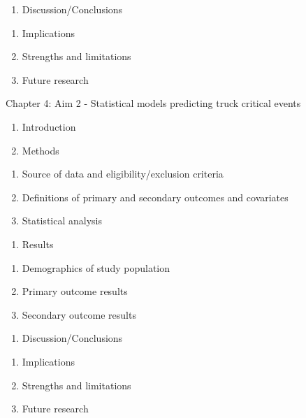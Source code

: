 \documentclass[12pt]{book}
\numberwithin{equation}{chapter}
\providecommand{\tightlist}{%
  \setlength{\itemsep}{0pt}\setlength{\parskip}{0pt}}
\begin{document}
\begin{enumerate}
\def\labelenumi{\Alph{enumi}.}
\setcounter{enumi}{3}
\tightlist
\item
  Discussion/Conclusions
\end{enumerate}

\begin{enumerate}
\def\labelenumi{\arabic{enumi}.}
\tightlist
\item
  Implications
\item
  Strengths and limitations
\item
  Future research
\end{enumerate}

Chapter 4: Aim 2 - Statistical models predicting truck critical events

\begin{enumerate}
\def\labelenumi{\Alph{enumi}.}
\tightlist
\item
  Introduction
\item
  Methods
\end{enumerate}

\begin{enumerate}
\def\labelenumi{\arabic{enumi}.}
\tightlist
\item
  Source of data and eligibility/exclusion criteria
\item
  Definitions of primary and secondary outcomes and covariates
\item
  Statistical analysis
\end{enumerate}

\begin{enumerate}
\def\labelenumi{\Alph{enumi}.}
\setcounter{enumi}{2}
\tightlist
\item
  Results
\end{enumerate}

\begin{enumerate}
\def\labelenumi{\arabic{enumi}.}
\tightlist
\item
  Demographics of study population
\item
  Primary outcome results
\item
  Secondary outcome results
\end{enumerate}

\begin{enumerate}
\def\labelenumi{\Alph{enumi}.}
\setcounter{enumi}{3}
\tightlist
\item
  Discussion/Conclusions
\end{enumerate}

\begin{enumerate}
\def\labelenumi{\arabic{enumi}.}
\tightlist
\item
  Implications
\item
  Strengths and limitations
\item
  Future research
\end{enumerate}
\end{document}
